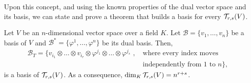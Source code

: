 Upon this concept, and using the known properties of the dual vector space and its basis, we can state and prove a theorem that builds a basis for every ${\mathcal T}_{r,s}(V)$.

\begin{theorem}
	Let $V$ be an $n$-dimensional vector space over a field $K$. Let $\mathcal{B} = \{v_1, \dots, v_n\}$ be a basis of $V$ and $\mathcal{B^*} = \{\varphi^1, \dots, \varphi^n\}$ be  its dual basis. Then,
	\begin{align*}
		\mathcal{B}_T = \{v_{i_1} \otimes \dots \otimes v_{i_r} \otimes \varphi^{j_1} \otimes \dots \otimes \varphi^{j_s} \textrm{ , } &\textrm{where every index moves} \\
		&\textrm{independently from $1$ to $n$}\},
	\end{align*}
	is a basis of ${\mathcal T}_{r,s}(V)$. As a consequence, $\dim_K{\mathcal T}_{r,s}(V) = n^{r+s}$.
\end{theorem}

